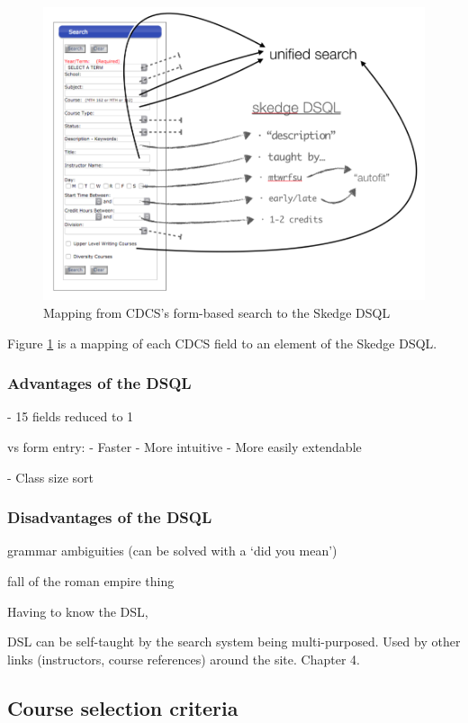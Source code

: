 \begin{figure}[ht]
  \centering
  \vspace{10pt}
  \includegraphics[width=12cm]{images/search-mapping}
  \caption{Mapping from CDCS's form-based search to the Skedge DSQL} \label{fig:search-mapping}
\end{figure}

Figure \ref{fig:search-mapping} is a mapping of each CDCS field to an element of the Skedge DSQL.

  \subsubsection{Advantages of the DSQL}

  - 15 fields reduced to 1

  vs form entry:
  - Faster
  - More intuitive
  - More easily extendable

  - Class size sort

  \subsubsection{Disadvantages of the DSQL}
  grammar ambiguities (can be solved with a `did you mean')

    fall of the roman empire thing

  Having to know the DSL, 

  DSL can be self-taught by the search system being multi-purposed. Used by other links (instructors, course references) around the site. Chapter 4.


\subsection{Course selection criteria}

